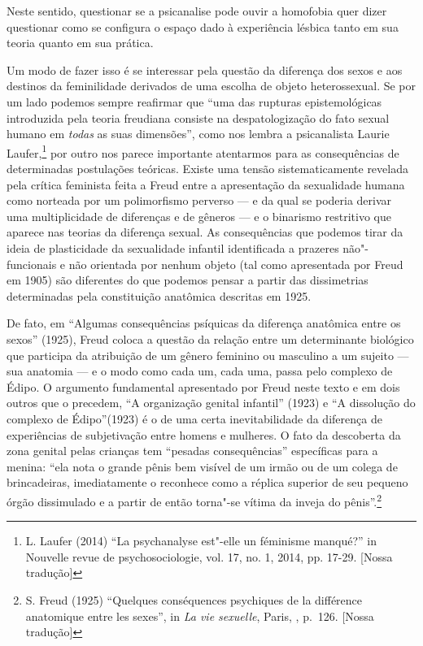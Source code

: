 Neste sentido, questionar se a psicanalise pode ouvir a homofobia quer
dizer questionar como se configura o espaço dado à experiência lésbica
tanto em sua teoria quanto em sua prática.

Um modo de fazer isso é se interessar pela questão da diferença dos
sexos e aos destinos da feminilidade derivados de uma escolha de objeto
heterossexual. Se por um lado podemos sempre reafirmar que ``uma das
rupturas epistemológicas introduzida pela teoria freudiana consiste na
despatologização do fato sexual humano em \emph{todas} as suas
dimensões'', como nos lembra a psicanalista Laurie Laufer,\footnote{L.
  Laufer (2014) ``La psychanalyse est"-elle un féminisme manqué?'' in
  Nouvelle revue de psychosociologie, vol. 17, no. 1, 2014, pp. 17-29.
  {[}Nossa tradução{]}} por outro nos parece importante atentarmos para
as consequências de determinadas postulações teóricas. Existe uma tensão
sistematicamente revelada pela crítica feminista feita a Freud entre a
apresentação da sexualidade humana como norteada por um polimorfismo
perverso --- e da qual se poderia derivar uma multiplicidade de
diferenças e de gêneros --- e o binarismo restritivo que aparece nas
teorias da diferença sexual. As consequências que podemos tirar da ideia
de plasticidade da sexualidade infantil identificada a prazeres
não"-funcionais e não orientada por nenhum objeto (tal como apresentada
por Freud em 1905) são diferentes do que podemos pensar a partir das
dissimetrias determinadas pela constituição anatômica descritas em 1925.

De fato, em ``Algumas consequências psíquicas da diferença anatômica
entre os sexos'' (1925), Freud coloca a questão da relação entre um
determinante biológico que participa da atribuição de um gênero feminino
ou masculino a um sujeito --- sua anatomia --- e o modo como cada um, cada
uma, passa pelo complexo de Édipo. O argumento fundamental apresentado
por Freud neste texto e em dois outros que o precedem, ``A organização
genital infantil'' (1923) e ``A dissolução do complexo de Édipo''(1923)
é o de uma certa inevitabilidade da diferença de experiências de
subjetivação entre homens e mulheres. O fato da descoberta da zona
genital pelas crianças tem ``pesadas consequências'' específicas para a
menina: ``ela nota o grande pênis bem visível de um irmão ou de um
colega de brincadeiras, imediatamente o reconhece como a réplica
superior de seu pequeno órgão dissimulado e a partir de então torna"-se
vítima da inveja do pênis''.\footnote{S. Freud (1925) ``Quelques
  conséquences psychiques de la différence anatomique entre les sexes'',
  in \emph{La vie sexuelle}, Paris, , p.~126. {[}Nossa tradução{]}}

